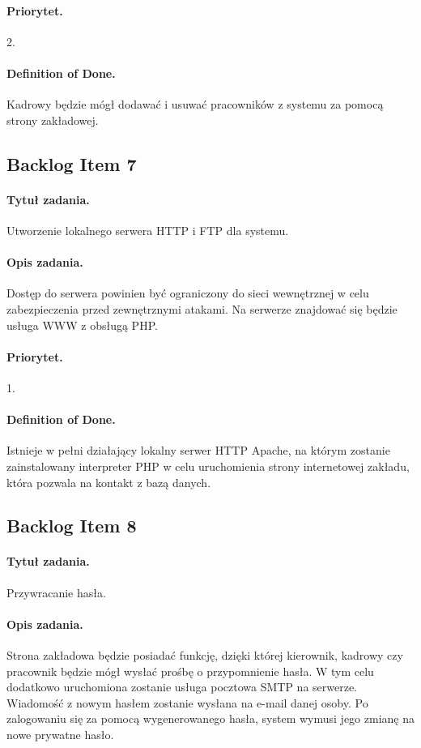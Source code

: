 \documentclass[a4paper]{article}
\begin{document}
\paragraph{Priorytet.} 2.
\paragraph{Definition of Done.} Kadrowy będzie mógł dodawać i usuwać pracowników z systemu za pomocą strony zakładowej.

\subsection{Backlog Item 7}
\paragraph{Tytuł zadania.} Utworzenie lokalnego serwera HTTP i FTP dla systemu.
\paragraph{Opis zadania.} Dostęp do serwera powinien być ograniczony do sieci wewnętrznej w celu zabezpieczenia przed zewnętrznymi atakami. Na serwerze znajdować się będzie usługa WWW z obsługą PHP.
\paragraph{Priorytet.} 1.
\paragraph{Definition of Done.} Istnieje w pełni działający lokalny serwer HTTP Apache, na którym zostanie zainstalowany interpreter PHP w celu uruchomienia strony internetowej zakładu, która pozwala na kontakt z bazą danych.

\subsection{Backlog Item 8}
\paragraph{Tytuł zadania.} Przywracanie hasła.
\paragraph{Opis zadania.} Strona zakładowa będzie posiadać funkcję, dzięki której kierownik, kadrowy czy pracownik będzie mógł wysłać prośbę o przypomnienie hasła. W tym celu dodatkowo uruchomiona zostanie usługa pocztowa SMTP na serwerze. Wiadomość z nowym hasłem zostanie wysłana na e-mail danej osoby. Po zalogowaniu się za pomocą wygenerowanego hasła, system wymusi jego zmianę na nowe prywatne hasło.
\end{document}
